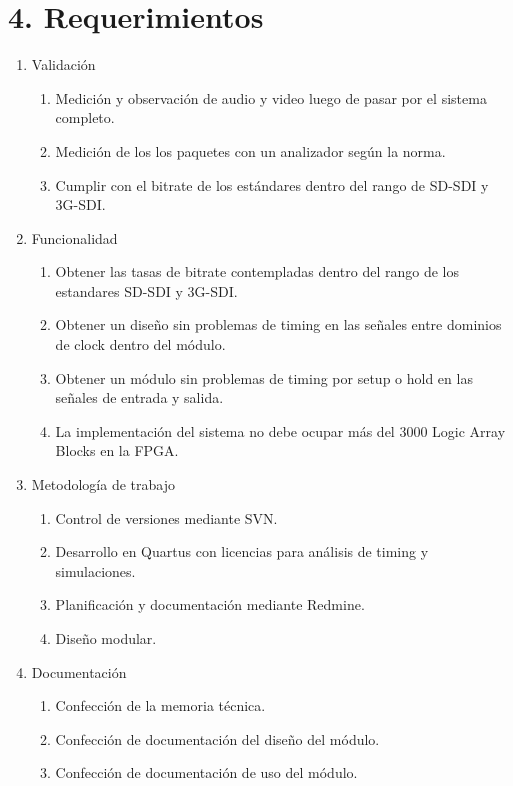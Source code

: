 \documentclass[11pt]{charter}
\begin{document}
\section{4. Requerimientos}
\label{sec:requerimientos}

\begin{enumerate}
\item Validación
	\begin{enumerate}
	\item Medición y observación de audio y video luego de pasar por el sistema completo.
	\item Medición de los los paquetes con un analizador según la norma.
	\item Cumplir con el bitrate de los estándares dentro del rango de SD-SDI y 3G-SDI.
	\end{enumerate}
\item Funcionalidad
	\begin{enumerate}
	\item Obtener las tasas de bitrate contempladas dentro del rango de los estandares SD-SDI y 3G-SDI.
	\item Obtener un diseño sin problemas de timing en las señales entre dominios de clock dentro del módulo.
	\item Obtener un módulo sin problemas de timing por setup o hold en las señales de entrada y salida.
	\item La implementación del sistema no debe ocupar más del 3000 Logic Array Blocks en la FPGA.
	\end{enumerate}
\item Metodología de trabajo
	\begin{enumerate}
	\item Control de versiones mediante SVN.
	\item Desarrollo en Quartus con licencias para análisis de timing y simulaciones.
	\item Planificación y documentación mediante Redmine.
	\item Diseño modular.
	\end{enumerate}
\item Documentación
	\begin{enumerate}
	\item Confección de la memoria técnica.
	\item Confección de documentación del diseño del módulo.
	\item Confección de documentación de uso del módulo.
	\end{enumerate}
\end{enumerate}
\end{document}
